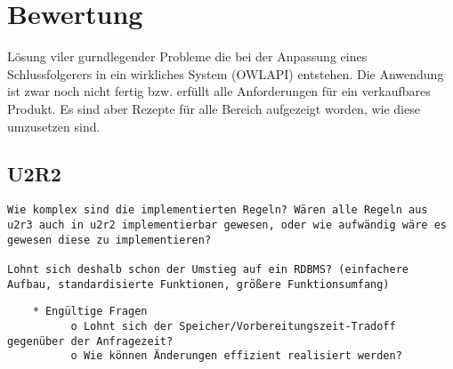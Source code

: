 \chapter{Bewertung}

Lösung viler gurndlegender Probleme die bei der Anpassung eines Schlussfolgerers in ein wirkliches System (OWLAPI) entstehen. Die Anwendung ist zwar noch nicht fertig bzw. erfüllt alle Anforderungen für ein verkaufbares Produkt. Es sind aber Rezepte für alle Bereich aufgezeigt worden, wie diese umzusetzen sind.

\section{U2R2}
\begin{verbatim} 
Wie komplex sind die implementierten Regeln? Wären alle Regeln aus u2r3 auch in u2r2 implementierbar gewesen, oder wie aufwändig wäre es gewesen diese zu implementieren?

Lohnt sich deshalb schon der Umstieg auf ein RDBMS? (einfachere Aufbau, standardisierte Funktionen, größere Funktionsumfang) 
\end{verbatim}

\begin{verbatim}
    * Engültige Fragen
          o Lohnt sich der Speicher/Vorbereitungszeit-Tradoff gegenüber der Anfragezeit?
          o Wie können Änderungen effizient realisiert werden? 
\end{verbatim}
